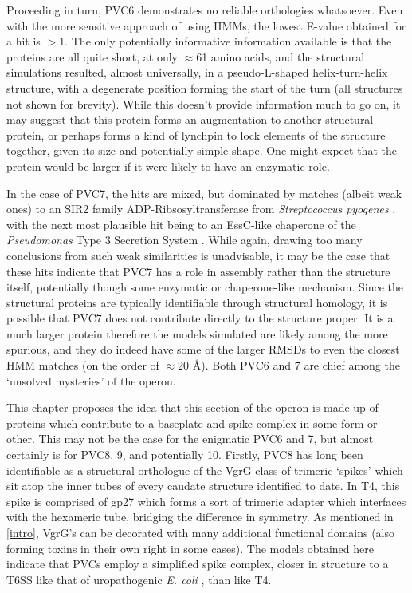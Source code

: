 Proceeding in turn, PVC6 demonstrates no reliable orthologies whatsoever. Even with the more sensitive approach of using HMMs, the lowest E-value obtained for a hit is $>$1. The only potentially informative information available is that the proteins are all quite short, at only $\approx$61 amino acids, and the structural simulations resulted, almost universally, in a pseudo-L-shaped helix-turn-helix structure, with a degenerate position forming the start of the turn (all structures not shown for brevity). While this doesn't provide information much to go on, it may suggest that this protein forms an augmentation to another structural protein, or perhaps forms a kind of lynchpin to lock elements of the structure together, given its size and potentially simple shape. One might expect that the protein would be larger if it were likely to have an enzymatic role.


In the case of PVC7, the hits are mixed, but dominated by matches (albeit weak ones) to an SIR2 family ADP-Ribsosyltransferase from \emph{Streptococcus pyogenes} \citep{Shore2000}, with the next most plausible hit being to an EssC-like chaperone of the \emph{Pseudomonas} Type 3 Secretion System \citep{Vogelaar2010}. While again, drawing too many conclusions from such weak similarities is unadvisable, it may be the case that these hits indicate that PVC7 has a role in assembly rather than the structure itself, potentially though some enzymatic or chaperone-like mechanism. Since the structural proteins are typically identifiable through structural homology, it is possible that PVC7 does not contribute directly to the structure proper. It is a much larger protein therefore the models simulated are likely among the more spurious, and they do indeed have some of the larger RMSDs to even the closest HMM matches (on the order of $\approx$20 \AA). Both PVC6 and 7 are chief among the `unsolved mysteries' of the operon.

This chapter proposes the idea that this section of the operon is made up of proteins which contribute to a baseplate and spike complex in some form or other. This may not be the case for the enigmatic PVC6 and 7, but almost certainly is for PVC8, 9, and potentially 10. Firstly, PVC8 has long been identifiable as a structural orthologue of the VgrG class of trimeric `spikes' which sit atop the inner tubes of every caudate structure identified to date. In T4, this spike is comprised of gp27 which forms a sort of trimeric adapter which interfaces with the hexameric tube, bridging the difference in symmetry. As mentioned in \ref{intro}, VgrG's can be decorated with many additional functional domains (also forming toxins in their own right in some cases). The models obtained here indicate that PVCs employ a simplified spike complex, closer in structure to a T6SS like that of uropathogenic \emph{E. coli} \citep{Leiman2009}, than like T4.

